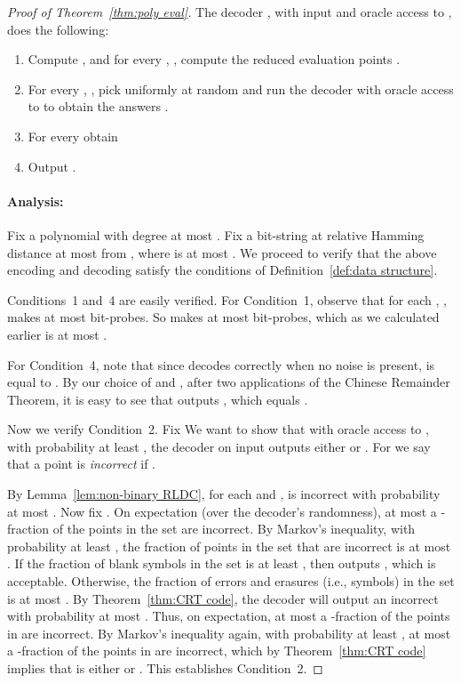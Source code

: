 \documentclass[11pt,english]{article}
\theoremstyle{definition}
\theoremstyle{remark}
\begin{document}
\begin{proof}[Proof of Theorem~\ref{thm:poly eval}]
The decoder , with input  and oracle access to ,
does the following: 
\begin{enumerate}
\item Compute  , and
for every , , compute the reduced
evaluation points . 
\item For every , , pick 
uniformly at random and run the decoder  with oracle access
to  to obtain the answers . 
\item For every  obtain 

\item Output . 
\end{enumerate}

\paragraph{\textbf{Analysis:}}
Fix a polynomial  with degree at most . Fix a bit-string 
at relative Hamming distance at most  from , where
 is at most .
We proceed to verify that the above encoding and decoding satisfy
the conditions of Definition~\ref{def:data structure}.

Conditions~1 and~4 are easily verified. For Condition~1, observe
that for each , ,  makes
at most  bit-probes. So  makes at most 
bit-probes, which as we calculated earlier is at most . 

For Condition~4, note that since  decodes correctly when
no noise is present,  is equal to .
By our choice of  and , after two applications of the Chinese Remainder Theorem, it is easy to see that
 outputs , which equals .

Now we verify Condition~2. Fix  We want to show that
with oracle access to , with probability at least , the decoder  on input  outputs either 
or .
For 
we say that a point  is \emph{incorrect} if . 

By Lemma~\ref{lem:non-binary RLDC}, for each  and ,  is incorrect with probability at most . Now fix . On expectation (over the decoder's randomness), at
most a -fraction of the points in the set 
are incorrect. By Markov's inequality, with probability at least ,
the fraction of points in the set 
that are incorrect is at most . If the fraction of
blank symbols in the set 
is at least , then  outputs , which
is acceptable. Otherwise, the fraction of errors and erasures (i.e.,  symbols) in
the set  is at most .
By Theorem~\ref{thm:CRT code}, the decoder  will output an incorrect 
with probability at most . 
Thus, on expectation, at most a -fraction of the points in  are incorrect.
By Markov's inequality again, with probability at least , at most a -fraction of the points in   are incorrect, which by Theorem~\ref{thm:CRT code} implies that  is either  or .
This establishes Condition~2.


\end{proof}
\end{document}
